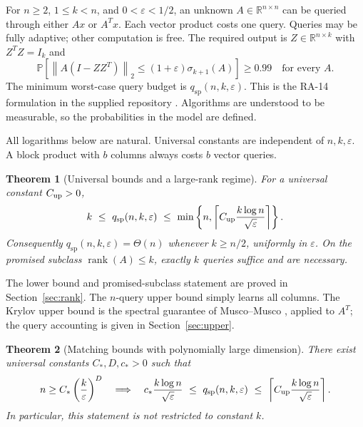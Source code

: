\documentclass[11pt]{article}
\numberwithin{equation}{section}
\newtheorem{theorem}{Theorem}[section]
\theoremstyle{definition}
\newcommand{\R}{\mathbb R}
\newcommand{\Prb}{\mathbb P}
\newcommand{\norm}[1]{\left\lVert#1\right\rVert}
\newcommand{\rank}{\operatorname{rank}}
\newcommand{\qsp}{q_{\mathrm{sp}}}
\newcommand{\eps}{\varepsilon}
\begin{document}
For $n\ge2$, $1\le k<n$, and $0<\eps<1/2$, an unknown $A\in\R^{n\times n}$
can be queried through either $Ax$ or $A^Tx$. Each vector product costs one
query. Queries may be fully adaptive; other computation is free. The required
output is $Z\in\R^{n\times k}$ with $Z^TZ=I_k$ and
\begin{equation}
 \Prb\!\left[\norm{A(I-ZZ^T)}_2\le(1+\eps)\sigma_{k+1}(A)\right]\ge0.99
 \quad\text{for every }A.
 \label{eq:target}
\end{equation}
The minimum worst-case query budget is $\qsp(n,k,\eps)$. This is the
RA-14 formulation in the supplied repository \cite{RA14}. Algorithms are
understood to be measurable, so the probabilities in the model are defined.

All logarithms below are natural. Universal constants are independent of
$n,k,\eps$. A block product with $b$ columns always costs $b$ vector queries.

\begin{theorem}[Universal bounds and a large-rank regime]
\label{thm:global}
For a universal constant $C_{\rm up}>0$,
\begin{equation}
 k\ \le\ \qsp(n,k,\eps)\ \le\
 \min\left\{n,\left\lceil C_{\rm up}\frac{k\log n}{\sqrt\eps}\right\rceil\right\}.
 \label{eq:global}
\end{equation}
Consequently $\qsp(n,k,\eps)=\Theta(n)$ whenever $k\ge n/2$, uniformly in
$\eps$. On the promised subclass $\rank(A)\le k$, exactly $k$ queries suffice
and are necessary.
\end{theorem}

The lower bound and promised-subclass statement are proved in
Section~\ref{sec:rank}. The $n$-query upper bound simply learns all columns.
The Krylov upper bound is the spectral guarantee of Musco--Musco
\cite[Algorithm 2 and Theorem 10]{MM15}, applied to $A^T$; the query accounting
is given in Section~\ref{sec:upper}.

\begin{theorem}[Matching bounds with polynomially large dimension]
\label{thm:large}
There exist universal constants $C_*,D,c_*>0$ such that
\begin{equation}
 n\ge C_*\left(\frac{k}{\eps}\right)^D
 \quad\Longrightarrow\quad
 c_*\frac{k\log n}{\sqrt\eps}
 \ \le\ \qsp(n,k,\eps)
 \ \le\ \left\lceil C_{\rm up}\frac{k\log n}{\sqrt\eps}\right\rceil.
 \label{eq:largedim}
\end{equation}
In particular, this statement is not restricted to constant $k$.
\end{theorem}
\end{document}
